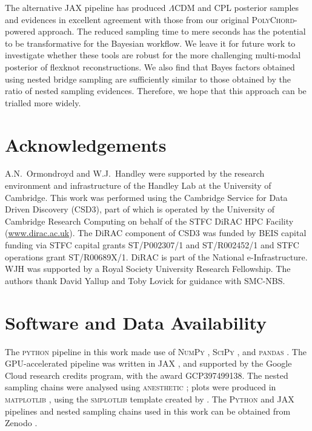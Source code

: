 \documentclass[fleqn,usenatbib]{mnras}
\newcommand{\lcdm}{$\Lambda$CDM}
\begin{document}
    The alternative \textsc{JAX} pipeline has produced \lcdm{} and CPL posterior samples and evidences in excellent agreement with those from our original \textsc{PolyChord}-powered approach.
    The reduced sampling time to mere seconds has the potential to be transformative for the Bayesian workflow.
    We leave it for future work to investigate whether these tools are robust for the more challenging multi-modal posterior of flexknot reconstructions.
    We also find that Bayes factors obtained using nested bridge sampling are sufficiently similar to those obtained by the ratio of nested sampling evidences. Therefore, we hope that this approach can be trialled more widely.

    \section*{Acknowledgements}

    A.N.~Ormondroyd and W.J.~Handley were supported by the research environment and infrastructure of the Handley Lab at the University of Cambridge.
    This work was performed using the Cambridge Service for Data Driven Discovery (CSD3), part of which is operated by the University of Cambridge Research Computing on behalf of the STFC DiRAC HPC Facility (\url{www.dirac.ac.uk}).
    The DiRAC component of CSD3 was funded by BEIS capital funding via STFC capital grants ST/P002307/1 and ST/R002452/1 and STFC operations grant ST/R00689X/1.
    DiRAC is part of the National e-Infrastructure.
    WJH was supported by a Royal Society University Research Fellowship.
    The authors thank David Yallup and Toby Lovick for guidance with SMC-NBS.

    \section*{Software and Data Availability}

    The \textsc{python} pipeline in this work made use of \textsc{NumPy} \citep{numpy}, \textsc{SciPy} \citep{scipy}, and \textsc{pandas} \citep{pandaszenodo, pandaspaper}.
    The GPU-accelerated pipeline was written in \textsc{JAX} \citep{jax2018github}, and supported by the Google Cloud research credits program, with the award GCP397499138.
    The nested sampling chains were analysed using \textsc{anesthetic} \citep{anesthetic}; plots were produced in \textsc{matplotlib} \citep{matplotlib}, using the \textsc{smplotlib} template created by \citet{smplotlib}.
    The \textsc{Python} and \textsc{JAX} pipelines and nested sampling chains used in this work can be obtained from Zenodo \citep{ormondroyd_2025_15025604}.
\end{document}
